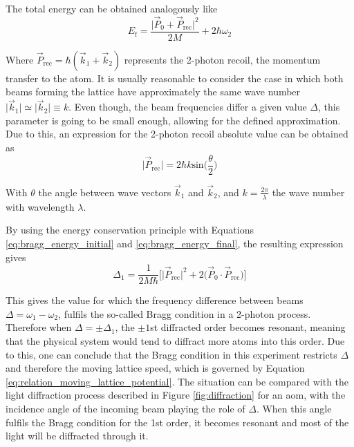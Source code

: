 The total energy can be obtained analogously like 
 \begin{equation}\label{eq:bragg_energy_final}
 	E_\text{f} = \frac{\mathopen\big|\vec{P}_0+\vec{P}_\text{rec}\mathclose\big|^2}{2M} + 2\hbar\omega_2
 \end{equation}
 
Where $\vec{P}_\text{rec} = \hbar (\vec{k}_1 + \vec{k}_2)$ represents the 2-photon recoil, the momentum transfer to the atom. It is usually reasonable to consider the case in which both beams forming the lattice have approximately the same wave number $\mathopen\big|\vec{k}_1\mathclose\big| \simeq \mathopen\big|\vec{k}_2\mathclose\big| \equiv k$. Even though, the beam frequencies differ a given value $\Delta$, this parameter is going to be small enough, allowing for the defined approximation. Due to this, an expression for the 2-photon recoil absolute value can be obtained as
\begin{equation}\label{eq:two_photon_recoil}
	\mathopen\big|\vec{P}_\text{rec}\mathclose\big| = 2 \hbar k \text{sin}\bigg(\frac{\theta}{2}\bigg)
\end{equation}

With $\theta$ the angle between wave vectors $\vec{k}_1$ and $\vec{k}_2$, and $k=\frac{2\pi}{\lambda}$ the wave number with wavelength $\lambda$.

By using the energy conservation principle with Equations \eqref{eq:bragg_energy_initial} and \eqref{eq:bragg_energy_final}, the resulting expression gives
\begin{equation}\label{eq:Bragg_condition_1}
	 \Delta_1 = \frac{1}{2M\hbar}\bigg[\mathopen\big|\vec{P}_{\text{rec}}\mathclose\big|^2 + 2\big(\vec{P}_0 \cdot \vec{P}_{\text{rec}}\big)\bigg]
\end{equation}

This gives the value for which the frequency difference between beams $\Delta = \omega_1-\omega_2$, fulfils the so-called Bragg condition in a 2-photon process. Therefore when $\Delta = \pm\Delta_1$, the $\pm1$st diffracted order becomes resonant, meaning that the physical system would tend to diffract more atoms into this order. Due to this, one can conclude that the Bragg condition in this experiment restricts $\Delta$ and therefore the moving lattice speed, which is governed by Equation \eqref{eq:relation_moving_lattice_potential}. The situation can be compared with the light diffraction process described in Figure \ref{fig:diffraction} for an \ac{aom}, with the incidence angle of the incoming beam playing the role of $\Delta$. When this angle fulfils the Bragg condition for the 1st order, it becomes resonant and most of the light will be diffracted through it. 

